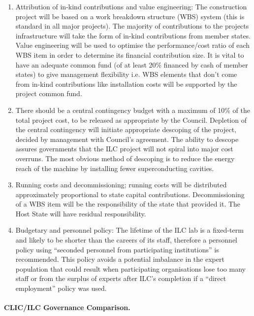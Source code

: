 \begin{enumerate}
\item Attribution of in-kind contributions and value engineering: The construction project will be based on a work breakdown structure (WBS) system (this is standard in all major projects). The majority of contributions to the projects infrastructure will take the form of in-kind contributions from member states. Value engineering will be used to optimise the performance/cost ratio of each WBS item in order to determine its financial contribution size. It is vital to have an adequate common fund (of at least 20\% financed by cash of member states) to give management flexibility i.e. WBS elements that don’t come from in-kind contributions like installation costs will be supported by the project common fund.

\item There should be a central contingency budget with a maximum of 10\% of the total project cost, to be released as appropriate by the Council. Depletion of the central contingency will initiate appropriate descoping of the project, decided by management with Council's agreement. The ability to descope assures governments that the ILC project will not spiral into major cost overruns. The most obvious method of descoping is to reduce the energy reach of the machine by installing fewer superconducting cavities.
\item Running costs and decommissioning; running costs will be distributed approximately proportional to state capital contributions. Decommissioning of a WBS item will be the responsibility of the state that provided it. The Host State will have residual responsibility.

\item Budgetary and personnel policy: The lifetime of the ILC lab is a fixed-term and likely to be shorter than the careers of its staff, therefore a personnel policy using ``seconded personnel from participating institutions'' is recommended. This policy avoids a potential imbalance in the expert population that could result when participating organisations lose too many staff or from the surplus of experts after ILC’s completion if a ``direct employment'' policy was used.

\end{enumerate}

\paragraph{CLIC/ILC Governance Comparison.}

